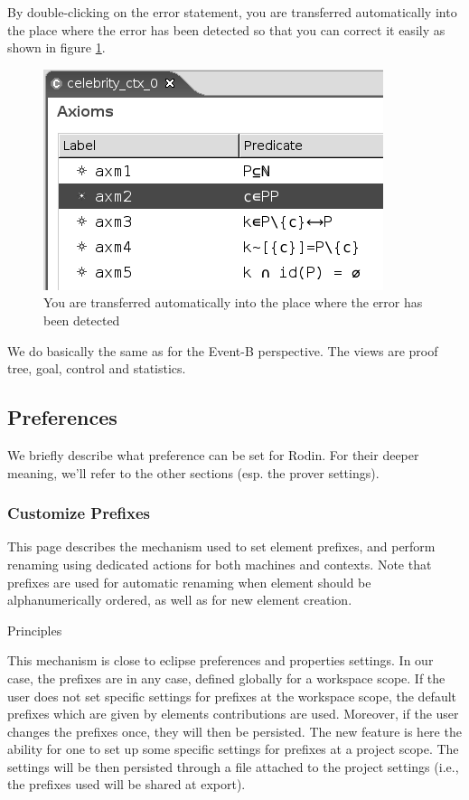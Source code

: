 By double-clicking on the error statement, you are transferred automatically into the place where the error has been detected so that you can correct it easily as shown in figure \ref{fig_ref_01_problemsview3}. 

\begin{figure}[!h]
\begin{center}
	\includegraphics{img/reference/ref_01_problemsview3.png}
	\caption{You are transferred automatically into the place where the error has been detected}
	\label{fig_ref_01_problemsview3}
\end{center}
\end{figure}


We do basically the same as for the Event-B perspective. The views are proof tree, goal, control and statistics.
 
\subsection{Preferences}

We briefly describe what preference can be set for Rodin. For their deeper meaning, we'll refer to the other sections (esp. the prover settings).

\subsubsection{Customize Prefixes}


This page describes the mechanism used to set element prefixes, and perform renaming using dedicated actions for both machines and contexts. Note that prefixes are used for automatic renaming when element should be alphanumerically ordered, as well as for new element creation. 

Principles

This mechanism is close to eclipse preferences and properties settings. In our case, the prefixes are in any case, defined globally for a workspace scope. If the user does not set specific settings for prefixes at the workspace scope, the default prefixes which are given by elements contributions are used. Moreover, if the user changes the prefixes once, they will then be persisted. The new feature is here the ability for one to set up some specific settings for prefixes at a project scope. The settings will be then persisted through a file attached to the project settings (i.e., the prefixes used will be shared at export).

